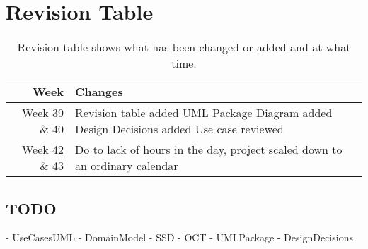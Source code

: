 \section{Revision Table}
\begin{table*}[ht]\centering
  \begin{tabularx}{\textwidth}{@{}rX@{}}
    \toprule
    \textbf{Week} & \textbf{Changes} \\\hline
    Week 39 \& 40 & Revision table added\newline  
		    		UML Package Diagram added\newline
		    		Design Decisions added\newline
		    		Use case reviewed\\\hline
	Week 42 \& 43 & Do to lack of hours in the day, project scaled down to an ordinary calendar \\
    \bottomrule
  \end{tabularx}
  \caption{Revision table shows what has been changed or added and at what time.}
  \label{glossary}\centering
\end{table*}

\subsection{TODO}
- UseCasesUML \newline
- DomainModel \newline
- SSD \newline
- OCT \newline
- UMLPackage \newline
- DesignDecisions \newline

\newpage